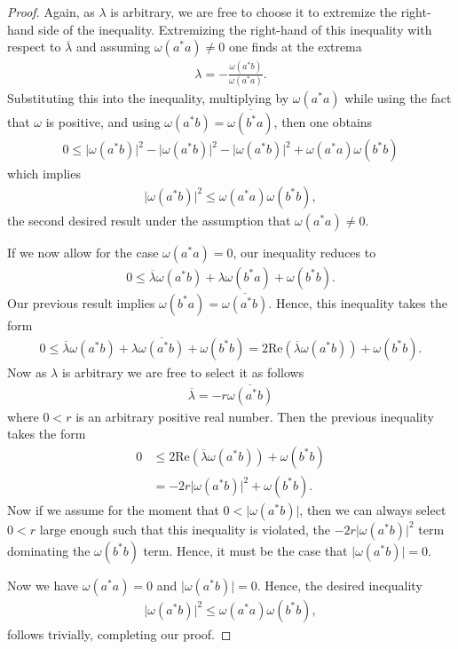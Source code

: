 \begin{proof}
Again, as $\lambda$ is arbitrary, we are free to choose it to extremize the right-hand side of the inequality. Extremizing the right-hand of this inequality with respect to $\overline{\lambda}$ and assuming $\omega(a^*a) \ne 0$ one finds at the extrema
\begin{align}
    \lambda = - \frac{\omega(a^*b)}{\omega(a^*a)}.
\end{align}
Substituting this into the inequality, multiplying by $\omega(a^*a)$ while using the fact that $\omega$ is positive, and using $\omega(a^*b) = \overline{\omega(b^*a)}$, then one obtains
\begin{align}
    0 \le \lvert \omega(a^*b) \rvert^2 - \lvert \omega(a^*b) \rvert^2 - \lvert \omega(a^*b) \rvert^2 + \omega(a^*a) \omega(b^*b)
\end{align}
which implies
\begin{align}
    \lvert \omega(a^*b) \rvert^2 \le \omega(a^*a) \omega(b^*b),
\end{align}
the second desired result under the assumption that $\omega(a^*a) \ne 0$.

If we now allow for the case $\omega(a^*a) = 0$, our inequality reduces to
\begin{align}
    0 \le \overline{\lambda}\omega(a^*b) + \lambda\omega(b^*a) + \omega(b^*b).
\end{align}
Our previous result implies $\omega(b^*a) = \overline{\omega(a^*b)}$. Hence, this inequality takes the form
\begin{align}
    0 \le \overline{\lambda}\omega(a^*b) + \lambda\overline{\omega(a^*b)} + \omega(b^*b) = 2\text{Re}\left(\overline{\lambda} \omega(a^*b)\right) + \omega(b^*b).
\end{align}
Now as $\lambda$ is arbitrary we are free to select it as follows
\begin{align}
    \overline{\lambda} = -r \overline{\omega(a^*b)}
\end{align}
where $0 < r$ is an arbitrary positive real number. Then the previous inequality takes the form
\begin{align}
    0 &\le 2\text{Re}\left(\overline{\lambda} \omega(a^*b)\right) + \omega(b^*b) \\
      &= -2r \lvert \omega(a^*b) \rvert^2 + \omega(b^*b).
\end{align}
Now if we assume for the moment that $0 < \lvert \omega(a^*b) \rvert$, then we can always select $0 < r$ large enough such that this inequality is violated, the $-2r \lvert \omega(a^*b) \rvert^2$ term dominating the $\omega(b^*b)$ term. Hence, it must be the case that $\lvert \omega(a^*b) \rvert = 0$.

Now we have $\omega(a^*a) = 0$ and $\lvert \omega(a^*b) \rvert = 0$. Hence, the desired inequality
\begin{align}
    \lvert \omega(a^*b) \rvert^2 \le \omega(a^*a) \omega(b^*b),
\end{align}
follows trivially, completing our proof.
\end{proof}

